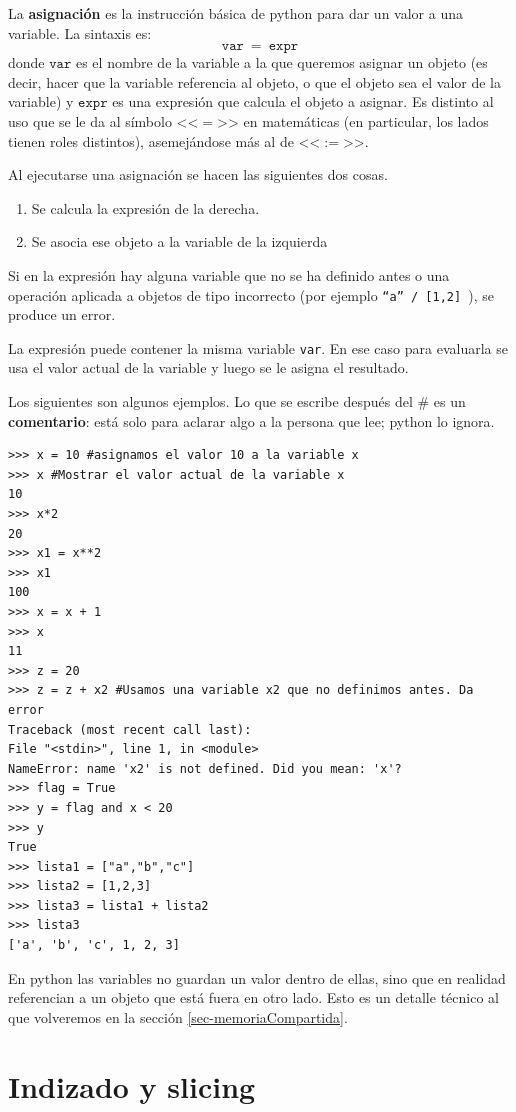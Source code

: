 \documentclass[a4paper, 12pt]{report}
\theoremstyle{definition}
\begin{document}
La {\bf asignación} es la instrucción básica de python para dar un valor a una variable. La sintaxis es:
$$\mathtt{var}~=~\mathtt{expr}$$
donde $\mathtt{var}$ es el nombre de la variable a la que queremos asignar un objeto (es decir, hacer que la variable referencia al objeto, o que el objeto sea el valor de la variable) y $\mathtt{expr}$ es una expresión que calcula el objeto a asignar. Es distinto al uso que se le da al símbolo <<$=$>> en matemáticas (en particular, los lados tienen roles distintos), asemejándose más al de <<$:=$>>.



Al ejecutarse una asignación se hacen las siguientes dos cosas.
\begin{enumerate}
	\item Se calcula la expresión de la derecha.
	\item Se asocia ese objeto a la variable de la izquierda
\end{enumerate}
Si en la expresión hay alguna variable que no se ha definido antes o una operación aplicada a objetos de tipo incorrecto (por ejemplo {\tt ``a'' / [1,2] }), se produce un error.

La expresión puede contener la misma variable {\tt var}. En ese caso para evaluarla se usa el valor actual de la variable y luego se le asigna el resultado.

Los siguientes son algunos ejemplos. Lo que se escribe después del \# es un {\bf comentario}: está solo para aclarar algo a la persona que lee; python lo ignora.

\begin{verbatim}
>>> x = 10 #asignamos el valor 10 a la variable x
>>> x #Mostrar el valor actual de la variable x
10
>>> x*2
20
>>> x1 = x**2
>>> x1
100
>>> x = x + 1
>>> x
11
>>> z = 20
>>> z = z + x2 #Usamos una variable x2 que no definimos antes. Da error
Traceback (most recent call last):
File "<stdin>", line 1, in <module>
NameError: name 'x2' is not defined. Did you mean: 'x'?
>>> flag = True
>>> y = flag and x < 20
>>> y
True
>>> lista1 = ["a","b","c"]
>>> lista2 = [1,2,3]
>>> lista3 = lista1 + lista2
>>> lista3
['a', 'b', 'c', 1, 2, 3]
\end{verbatim}
En python las variables no guardan un valor dentro de ellas, sino que en realidad referencian a un objeto que está fuera en otro lado. Esto es un detalle técnico al que volveremos en la sección \ref{sec-memoriaCompartida}.
\section{Indizado y slicing}
\end{document}
